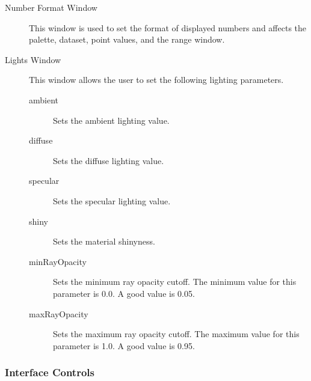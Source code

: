 \documentclass{article}
\begin{document}
\begin{description}
\item[Number Format Window]  This window is used to set the
format of displayed numbers and affects the palette, dataset,
point values, and the range window.

\item[Lights Window] This window allows the user to set the following
lighting parameters.

\begin{description}
\item [ambient]  Sets the ambient lighting value.

\item [diffuse]  Sets the diffuse lighting value.

\item [specular]  Sets the specular lighting value.

\item [shiny]  Sets the material shinyness.

\item [minRayOpacity]  Sets the minimum ray opacity cutoff.  The
minimum value for this parameter is 0.0.  A good value is 0.05.

\item [maxRayOpacity]  Sets the maximum ray opacity cutoff.  The
maximum value for this parameter is 1.0.  A good value is 0.95.
\end{description}

\end{description}


\subsubsection{Interface Controls}
\end{document}
